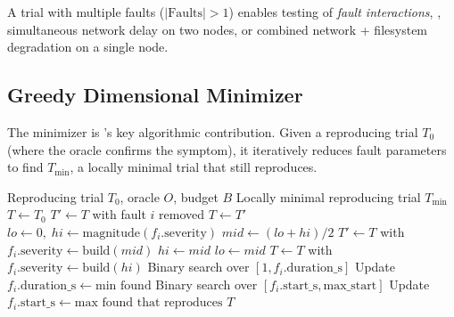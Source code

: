 A trial with multiple faults ($|\text{Faults}| > 1$) enables testing of
\emph{fault interactions}, \eg{}, simultaneous network delay on two nodes, or
combined network + filesystem degradation on a single node.

\subsection{Greedy Dimensional Minimizer}
\label{sec:minimizer}

The minimizer is \system{}'s key algorithmic contribution. Given a reproducing
trial $T_0$ (where the oracle confirms the symptom), it iteratively reduces
fault parameters to find $T_{\min}$, a locally minimal trial that still
reproduces.

\begin{algorithm}[t]
\caption{Greedy Dimensional Minimization}
\label{alg:minimizer}
\begin{algorithmic}[1]
\Require Reproducing trial $T_0$, oracle $O$, budget $B$
\Ensure Locally minimal reproducing trial $T_{\min}$
\State $T \gets T_0$
\Statex
\State {}
  \State $T' \gets T$ with fault $i$ removed
    \State $T \gets T'$ 
  \EndIf
\EndFor
\Statex
\State {}
  \State $lo \gets 0, \; hi \gets \text{magnitude}(f_i.\text{severity})$
    \State $mid \gets (lo + hi) / 2$
    \State $T' \gets T$ with $f_i.\text{severity} \gets \text{build}(mid)$
      \State $hi \gets mid$ 
    \Else
      \State $lo \gets mid$ 
    \EndIf
  \EndFor
  \State $T \gets T$ with $f_i.\text{severity} \gets \text{build}(hi)$
\EndFor
\Statex
\State {}
  \State Binary search over $[1, f_i.\text{duration\_s}]$
  \State Update $f_i.\text{duration\_s} \gets \text{min found}$
\EndFor
\Statex
\State {}
  \State Binary search over $[f_i.\text{start\_s}, \text{max\_start}]$
  \State Update $f_i.\text{start\_s} \gets \text{max found that reproduces}$
\EndFor
\State \Return $T$
\end{algorithmic}
\end{algorithm}

